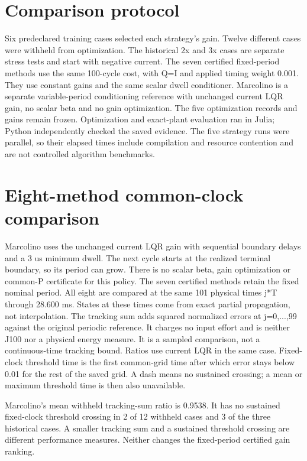 \documentclass[11pt,a4paper]{article}
\begin{document}
\section*{Comparison protocol}
Six predeclared training cases selected each strategy's gain. Twelve different cases were withheld from optimization. The historical 2x and 3x cases are separate stress tests and start with negative current. The seven certified fixed-period methods use the same 100-cycle cost, with Q=I and applied timing weight 0.001. They use constant gains and the same scalar dwell conditioner. Marcolino is a separate variable-period conditioning reference with unchanged current LQR gain, no scalar beta and no gain optimization. The five optimization records and gains remain frozen. Optimization and exact-plant evaluation ran in Julia; Python independently checked the saved evidence. The five strategy runs were parallel, so their elapsed times include compilation and resource contention and are not controlled algorithm benchmarks.
\clearpage\section*{Eight-method common-clock comparison}
Marcolino uses the unchanged current LQR gain with sequential boundary delays and a 3 us minimum dwell. The next cycle starts at the realized terminal boundary, so its period can grow. There is no scalar beta, gain optimization or common-P certificate for this policy. The seven certified methods retain the fixed nominal period. All eight are compared at the same 101 physical times j*T through 28.600 ms. States at these times come from exact partial propagation, not interpolation. The tracking sum adds squared normalized errors at j=0,...,99 against the original periodic reference. It charges no input effort and is neither J100 nor a physical energy measure. It is a sampled comparison, not a continuous-time tracking bound. Ratios use current LQR in the same case. Fixed-clock threshold time is the first common-grid time after which error stays below 0.01 for the rest of the saved grid. A dash means no sustained crossing; a mean or maximum threshold time is then also unavailable.

Marcolino's mean withheld tracking-sum ratio is 0.9538. It has no sustained fixed-clock threshold crossing in 2 of 12 withheld cases and 3 of the three historical cases. A smaller tracking sum and a sustained threshold crossing are different performance measures. Neither changes the fixed-period certified gain ranking.
\end{document}
